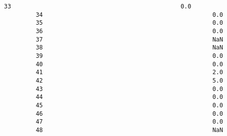 \documentclass[11pt]{article}
\begin{document}
\begin{Verbatim}[commandchars=\\\{\}]
         33                                                0.0               
         34                                                0.0               
         35                                                0.0               
         36                                                0.0               
         37                                                NaN               
         38                                                NaN               
         39                                                0.0               
         40                                                0.0               
         41                                                2.0               
         42                                                5.0               
         43                                                0.0               
         44                                                0.0               
         45                                                0.0               
         46                                                0.0               
         47                                                0.0               
         48                                                NaN               
         

\end{Verbatim}
\end{document}
